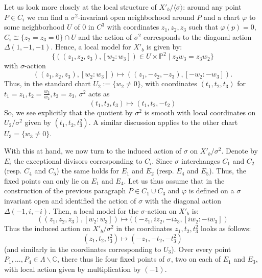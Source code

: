 \documentclass[12pt,reqno]{amsart}
\theoremstyle{definition}
\newcommand{\C}{\mathbb{C}}
\begin{document}
Let us look more closely at the local structure of $X'_b/\langle\sigma\rangle$: around any point $P\in C_i$ we can find a $\sigma^2$-invariant open neighborhood around $P$ and a chart $\varphi$ to some neighborhood $U$ of $0$ in $C^3$ with coordinates $z_1,z_2,z_3$ such that $\varphi(p)=0$, $C_i\cong\{z_2=z_3=0\}\cap U$ and the action of $\sigma^2$ corresponds to the diagonal action $\Delta(1,-1,-1)$. Hence, a local model for $X'_b$ is given by:
\[
\{((z_1,z_2,z_3),[w_2:w_3])\in U\times \mathbb{P}^2\mid z_2w_3=z_3w_2\}
\]
with $\sigma$-action
\[
((z_1,z_2,z_3),[w_2:w_3])\longmapsto((z_1,-z_2,-z_3),[-w_2:-w_3]).
\]
Thus, in the standard chart $U_2:=\{w_2\neq 0\}$, with coordinates $(t_1, t_2, t_3)$ for $t_1=z_1,t_2=\frac{w_3}{w_2}, t_3=z_3$, $\sigma^2$ acts as
\[
(t_1,t_2,t_3)\mapsto (t_1,t_2,-t_2)
\]
So, we see explicitly that the quotient by $\sigma^2$ is smooth with local coordinates on $U_2/\sigma^2$ given by $(t_1,t_2,t_3^2)$. A similar discussion applies to the other chart $U_3=\{w_3\neq 0\}$.

With this at hand, we now turn to the induced action of $\sigma$ on $X'_b/\sigma^2$. Denote by $E_i$ the exceptional divisors corresponding to $C_i$. Since $\sigma$ interchanges $C_1$ and $C_2$ (resp. $C_4$ and $C_5$) the same holds for $E_1$ and $E_2$ (resp. $E_4$ and $E_5$). Thus, the fixed points can only lie on $E_1$ and $E_4$. Let us thus assume that in the construction of the previous paragraph $P\in C_1\cup C_3$ and $\varphi$ is defined on a $\sigma$ invariant open and identified the action of $\sigma$ with the diagonal action $\Delta(-1,i,-i)$. Then, a local model for the $\sigma$-action on $X'_b$ is:
\[
((z_1,z_2,z_3),[w_2:w_3])\longmapsto ((-z_1,iz_2,-iz_3,[iw_2:-iw_3])
\]
Thus the induced action on $X'_b/\sigma^2$ in the coordinates $z_1,t_2,t_3^2$ looks as follows:
\[
(z_1,t_2,t_3^2)\longmapsto (-z_1,-t_2,-t_3^2)
\]
(and similarly in the coordinates corresponding to $U_3$). Over every point $P_1,...,P_4\in \Lambda\backslash\C$, there thus lie four fixed points of $\sigma$, two on each of $E_1$ and $E_3$, with local action given by multiplication by $(-1)$.
\end{document}
